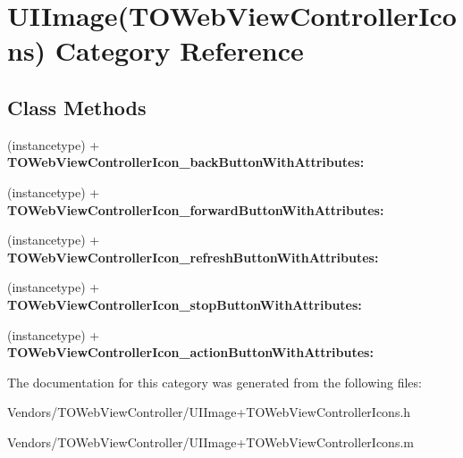 \hypertarget{category_u_i_image_07_t_o_web_view_controller_icons_08}{}\section{U\+I\+Image(T\+O\+Web\+View\+Controller\+Icons) Category Reference}
\label{category_u_i_image_07_t_o_web_view_controller_icons_08}
\subsection*{Class Methods}
\begin{DoxyCompactItemize}
\item 
\hypertarget{category_u_i_image_07_t_o_web_view_controller_icons_08_ad33229a2c06361a3d9db46b9d81aa57b}{}(instancetype) + {\bfseries T\+O\+Web\+View\+Controller\+Icon\+\_\+back\+Button\+With\+Attributes\+:}\label{category_u_i_image_07_t_o_web_view_controller_icons_08_ad33229a2c06361a3d9db46b9d81aa57b}

\item 
\hypertarget{category_u_i_image_07_t_o_web_view_controller_icons_08_abbfd8deaddfe9cc107644ec2cec184a0}{}(instancetype) + {\bfseries T\+O\+Web\+View\+Controller\+Icon\+\_\+forward\+Button\+With\+Attributes\+:}\label{category_u_i_image_07_t_o_web_view_controller_icons_08_abbfd8deaddfe9cc107644ec2cec184a0}

\item 
\hypertarget{category_u_i_image_07_t_o_web_view_controller_icons_08_adda6d23d470959f40fe9be7c25fe9c08}{}(instancetype) + {\bfseries T\+O\+Web\+View\+Controller\+Icon\+\_\+refresh\+Button\+With\+Attributes\+:}\label{category_u_i_image_07_t_o_web_view_controller_icons_08_adda6d23d470959f40fe9be7c25fe9c08}

\item 
\hypertarget{category_u_i_image_07_t_o_web_view_controller_icons_08_a7d4dd17d419d9ccbad05c9018796e2aa}{}(instancetype) + {\bfseries T\+O\+Web\+View\+Controller\+Icon\+\_\+stop\+Button\+With\+Attributes\+:}\label{category_u_i_image_07_t_o_web_view_controller_icons_08_a7d4dd17d419d9ccbad05c9018796e2aa}

\item 
\hypertarget{category_u_i_image_07_t_o_web_view_controller_icons_08_ab93e69561da9ce7854268fbbd1840481}{}(instancetype) + {\bfseries T\+O\+Web\+View\+Controller\+Icon\+\_\+action\+Button\+With\+Attributes\+:}\label{category_u_i_image_07_t_o_web_view_controller_icons_08_ab93e69561da9ce7854268fbbd1840481}

\end{DoxyCompactItemize}


The documentation for this category was generated from the following files\+:\begin{DoxyCompactItemize}
\item 
Vendors/\+T\+O\+Web\+View\+Controller/U\+I\+Image+\+T\+O\+Web\+View\+Controller\+Icons.\+h\item 
Vendors/\+T\+O\+Web\+View\+Controller/U\+I\+Image+\+T\+O\+Web\+View\+Controller\+Icons.\+m\end{DoxyCompactItemize}
